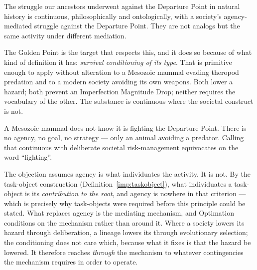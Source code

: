 \begin{principle}\label{gc:prin:continuity}
The struggle our ancestors underwent against the Departure Point in
natural history is continuous, philosophically and ontologically, with a
society's agency-mediated struggle against the Departure Point. They are
not analogs but the same activity under different mediation.
\end{principle}

The Golden Point is the target that respects this, and it does so
because of what kind of definition it has: \emph{survival conditioning
of its type}. That is primitive enough to apply without alteration to a
Mesozoic mammal evading theropod predation and to a modern society
avoiding its own weapons. Both lower a hazard; both prevent an
Imperfection Magnitude Drop; neither requires the vocabulary of the
other. The substance is continuous where the societal construct is not.

\begin{objection}[Agency]\label{gc:obj:agency}
A Mesozoic mammal does not know it is fighting the Departure Point.
There is no agency, no goal, no strategy --- only an animal avoiding a
predator. Calling that continuous with deliberate societal
risk-management equivocates on the word ``fighting''.
\end{objection}

\noindent The objection assumes agency is what individuates the
activity. It is not. By the task-object construction (Definition~\ref{imp:taskobject}), what individuates a task-object
is its \emph{contribution to the root}, and agency is nowhere in that
criterion --- which is precisely why task-objects were required before
this principle could be stated. What replaces agency is the mediating mechanism, and Optimation
conditions on the mechanism rather than around it. Where a society
lowers its hazard through deliberation, a lineage lowers its through
evolutionary selection; the conditioning does not care which, because
what it fixes is that the hazard be lowered. It therefore reaches
\emph{through} the mechanism to whatever contingencies the mechanism
requires in order to operate.

